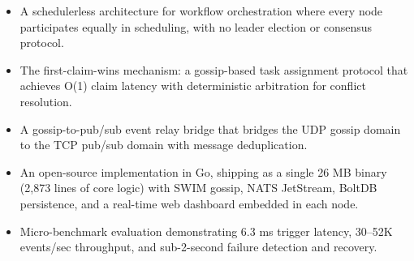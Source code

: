 \begin{itemize}
\item A schedulerless architecture for workflow orchestration where every node participates equally in scheduling, with no leader election or consensus protocol.
\item The first-claim-wins mechanism: a gossip-based task assignment protocol that achieves O(1) claim latency with deterministic arbitration for conflict resolution.
\item A gossip-to-pub/sub event relay bridge that bridges the UDP gossip domain to the TCP pub/sub domain with message deduplication.
\item An open-source implementation in Go, shipping as a single 26 MB binary (2,873 lines of core logic) with SWIM gossip, NATS JetStream, BoltDB persistence, and a real-time web dashboard embedded in each node.
\item Micro-benchmark evaluation demonstrating 6.3 ms trigger latency, 30--52K events/sec throughput, and sub-2-second failure detection and recovery.
\end{itemize}
